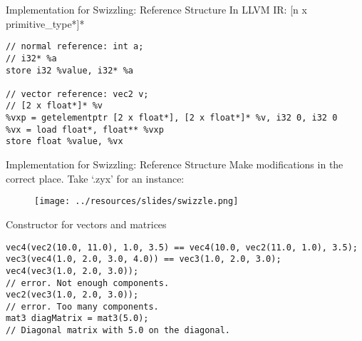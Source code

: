 \begin{frame}[fragile]{Implementation for Swizzling: Reference Structure}
    In LLVM IR: [n x primitive\_type*]*
    \begin{lstlisting}
// normal reference: int a;
// i32* %a
store i32 %value, i32* %a

// vector reference: vec2 v;
// [2 x float*]* %v
%vxp = getelementptr [2 x float*], [2 x float*]* %v, i32 0, i32 0
%vx = load float*, float** %vxp
store float %value, %vx
    \end{lstlisting}
\end{frame}

\begin{frame}{Implementation for Swizzling: Reference Structure}
    Make modifications in the correct place. Take `.zyx' for an instance:
    \begin{figure}
        \texttt{[image: ../resources/slides/swizzle.png]}
    \end{figure}
\end{frame}

\begin{frame}[fragile]{Constructor for vectors and matrices}
    \begin{lstlisting}
vec4(vec2(10.0, 11.0), 1.0, 3.5) == vec4(10.0, vec2(11.0, 1.0), 3.5);
vec3(vec4(1.0, 2.0, 3.0, 4.0)) == vec3(1.0, 2.0, 3.0);
vec4(vec3(1.0, 2.0, 3.0)); 
// error. Not enough components.
vec2(vec3(1.0, 2.0, 3.0)); 
// error. Too many components.
mat3 diagMatrix = mat3(5.0);
// Diagonal matrix with 5.0 on the diagonal.
    \end{lstlisting}
\end{frame}
